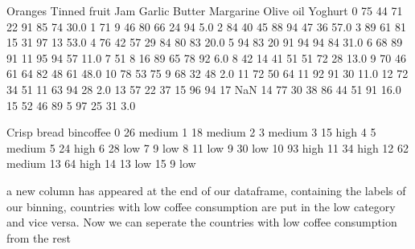 \documentclass[letterpaper,10pt,english]{jupyterBook}
\begin{document}
\begin{sphinxVerbatim}[commandchars=\\\{\}]
    Oranges  Tinned fruit  Jam  Garlic  Butter  Margarine  Olive oil  Yoghurt  \PYGZbs{}
0        75            44   71      22      91         85         74     30.0   
1        71             9   46      80      66         24         94      5.0   
2        84            40   45      88      94         47         36     57.0   
3        89            61   81      15      31         97         13     53.0   
4        76            42   57      29      84         80         83     20.0   
5        94            83   20      91      94         94         84     31.0   
6        68            89   91      11      95         94         57     11.0   
7        51             8   16      89      65         78         92      6.0   
8        42            14   41      51      51         72         28     13.0   
9        70            46   61      64      82         48         61     48.0   
10       78            53   75       9      68         32         48      2.0   
11       72            50   64      11      92         91         30     11.0   
12       72            34   51      11      63         94         28      2.0   
13       57            22   37      15      96         94         17      NaN   
14       77            30   38      86      44         51         91     16.0   
15       52            46   89       5      97         25         31      3.0   

    Crisp bread bin\PYGZus{}coffee  
0            26     medium  
1            18     medium  
2             3     medium  
3            15       high  
4             5     medium  
5            24       high  
6            28        low  
7             9        low  
8            11        low  
9            30        low  
10           93       high  
11           34       high  
12           62     medium  
13           64       high  
14           13        low  
15            9        low  
\end{sphinxVerbatim}

\sphinxAtStartPar
a new column has appeared at the end of our dataframe, containing the labels of our binning, countries with low coffee consumption are put in the low category and vice versa.
Now we can seperate the countries with low coffee consumption from the rest

\begin{sphinxVerbatim}[commandchars=\\\{\}]
\PYG{p}{[}  \PYG{p}{]}
\end{sphinxVerbatim}
\end{document}
